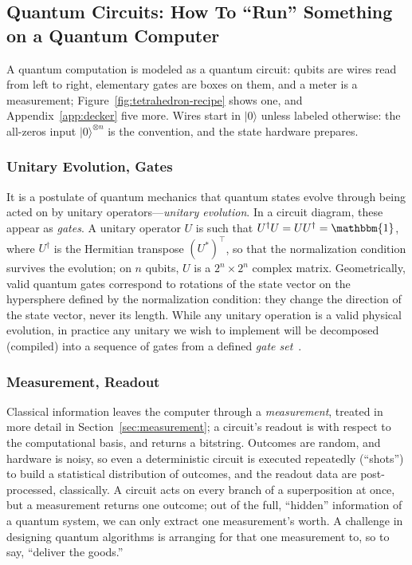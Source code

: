 \documentclass[11pt, oneside, openany]{scrbook}
\newcommand{\Id}{\mathbbm{1}}
\newcommand{\ket}[1]{|#1\rangle}
\begin{document}
\subsection{Quantum Circuits: How To ``Run'' Something on a Quantum Computer} \label{sec:quantum_circuits}

A quantum computation is modeled as a quantum circuit: qubits are wires read from left to right, elementary gates are boxes on them, and a meter is a measurement; Figure~\ref{fig:tetrahedron-recipe} shows one, and Appendix~\ref{app:decker} five more. Wires start in $\ket{0}$ unless labeled otherwise: the all-zeros input $\ket{0}^{\otimes n}$ is the convention, and the state hardware prepares.

\subsubsection{Unitary Evolution, Gates}

It is a postulate of quantum mechanics that quantum states evolve through being acted on by unitary operators---\textit{unitary evolution}. In a circuit diagram, these appear as \textit{gates}. A unitary operator $U$ is such that $U^\dagger U = U U^\dagger = \Id$, where $U^\dagger$ is the Hermitian transpose $(U^*)^\top$, so that the normalization condition survives the evolution; on $n$ qubits, $U$ is a $2^n \times 2^n$ complex matrix. Geometrically, valid quantum gates correspond to rotations of the state vector on the hypersphere defined by the normalization condition: they change the direction of the state vector, never its length. While any unitary operation is a valid physical evolution, in practice any unitary we wish to implement will be decomposed (compiled) into a sequence of gates from a defined \textit{gate set}~\cite{nielsen2010quantumcomputationquantum}.

\subsubsection{Measurement, Readout}

Classical information leaves the computer through a \textit{measurement}, treated in more detail in Section~\ref{sec:measurement}; a circuit's readout is with respect to the computational basis, and returns a bitstring. Outcomes are random, and hardware is noisy, so even a deterministic circuit is executed repeatedly (``shots'') to build a statistical distribution of outcomes, and the readout data are post-processed, classically. A circuit acts on every branch of a superposition at once, but a measurement returns one outcome; out of the full, ``hidden'' information of a quantum system, we can only extract one measurement's worth. A challenge in designing quantum algorithms is arranging for that one measurement to, so to say, ``deliver the goods.''
\end{document}
